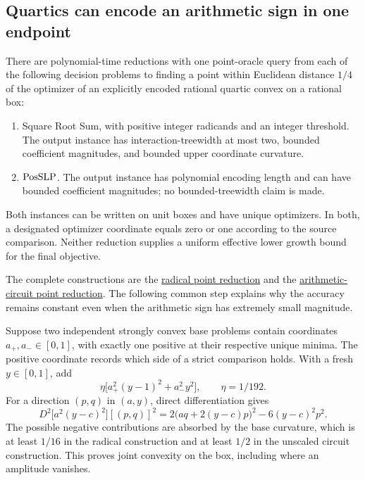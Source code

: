 \subsection{Quartics can encode an arithmetic sign in one endpoint}

\begin{theorem}
\label{thm:quartic-point-lower}
There are polynomial-time reductions with one point-oracle query from
each of the following decision problems to finding a point within
Euclidean distance $1/4$ of the optimizer of an explicitly encoded
rational quartic convex on a rational box:
\begin{enumerate}[label=(\roman*)]
\item Square Root Sum, with positive integer radicands and an integer
threshold. The output instance has interaction-treewidth at most two,
bounded coefficient magnitudes, and bounded upper coordinate curvature.
\item $\mathrm{PosSLP}$. The output instance has polynomial encoding length
and can have bounded coefficient magnitudes; no bounded-treewidth
claim is made.
\end{enumerate}
Both instances can be written on unit boxes and have unique
optimizers. In both, a designated optimizer coordinate equals zero or
one according to the source comparison. Neither reduction supplies a
uniform effective lower growth bound for the final objective.
\end{theorem}

The complete constructions are the
\href{../../research-20261002/new-direction/convex-point-radical-comparison.md}{radical point reduction}
and the
\href{../../research-20261002/new-direction/posslp-convex-point-extraction.md}{arithmetic-circuit point reduction}.
The following common step explains why the accuracy remains constant
even when the arithmetic sign has extremely small magnitude.

Suppose two independent strongly convex base problems contain
coordinates $a_+,a_-\in[0,1]$, with exactly one positive at their
respective unique minima. The positive coordinate records which side
of a strict comparison holds. With a fresh $y\in[0,1]$, add
\begin{equation}
 \eta\bigl[a_+^2(y-1)^2+a_-^2y^2\bigr],
 \qquad\eta=1/192.
 \label{eq:endpoint-amplifier}
\end{equation}
For a direction $(p,q)$ in $(a,y)$, direct differentiation gives
\[
 D^2\bigl[a^2(y-c)^2\bigr][(p,q)]^2
 =2\bigl(aq+2(y-c)p\bigr)^2-6(y-c)^2p^2.
\]
The possible negative contributions are absorbed by the base
curvature, which is at least $1/16$ in the radical construction and
at least $1/2$ in the unscaled circuit construction. This proves
joint convexity on the box, including where an amplitude vanishes.

